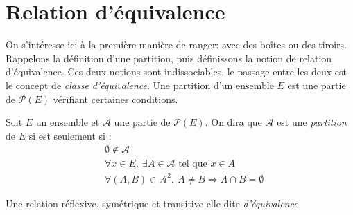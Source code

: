 \section{Relation d'équivalence}
On s'intéresse ici à la première manière de ranger: avec des boîtes ou des tiroirs. Rappelons la définition d'une partition, puis définissons la notion de relation d'équivalence. Ces deux notions sont indissociables, le passage entre les deux est le concept de \emph{classe d'équivalence}.\newline
Une partition d'un ensemble $E$ est une partie de $\mathcal{P}(E)$ vérifiant certaines conditions.
\begin{defi}[partition]
Soit $E$ un ensemble et $\mathcal{A}$ une partie de $\mathcal{P}(E)$.\newline
On dira que $\mathcal A$ est une \emph{partition} de $E$ si est seulement si :
\begin{align*}
 &\emptyset \not \in \mathcal A \\
 &\forall x\in E,\: \exists A \in \mathcal{A} \text{ tel que } x\in A \\
 &\forall (A,B)\in \mathcal{A}^2, \: A \neq B \Rightarrow A \cap B =\emptyset
\end{align*}
\end{defi}


\begin{defi}
 Une relation réflexive, symétrique et transitive elle dite \emph{d'équivalence}
\end{defi}

